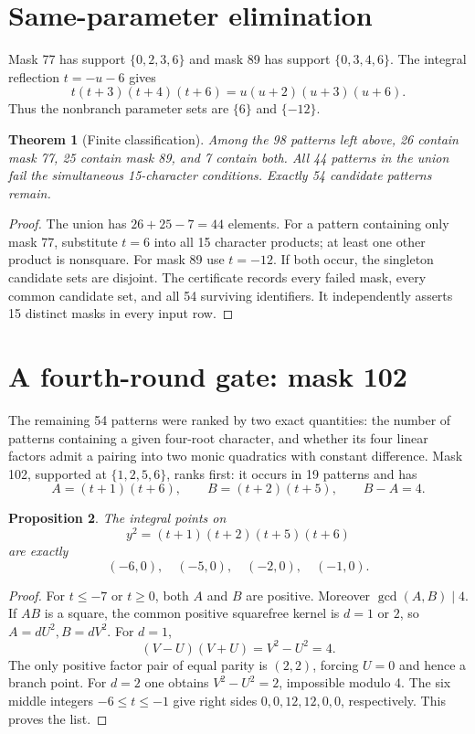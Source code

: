 \documentclass[11pt]{article}
\newtheorem{theorem}{Theorem}
\newtheorem{proposition}[theorem]{Proposition}
\begin{document}
\section{Same-parameter elimination}
Mask 77 has support $\{0,2,3,6\}$ and mask 89 has support
$\{0,3,4,6\}$. The integral reflection $t=-u-6$ gives
\[
 t(t+3)(t+4)(t+6)=u(u+2)(u+3)(u+6).
\]
Thus the nonbranch parameter sets are $\{6\}$ and $\{-12\}$.

\begin{theorem}[Finite classification]\label{thm:54}
Among the 98 patterns left above, 26 contain mask 77, 25 contain mask 89,
and 7 contain both. All 44 patterns in the union fail the simultaneous
15-character conditions. Exactly 54 candidate patterns remain.
\end{theorem}
\begin{proof}
The union has $26+25-7=44$ elements. For a pattern containing only mask
77, substitute $t=6$ into all 15 character products; at least one other
product is nonsquare. For mask 89 use $t=-12$. If both occur, the
singleton candidate sets are disjoint. The certificate records every
failed mask, every common candidate set, and all 54 surviving identifiers.
It independently asserts 15 distinct masks in every input row.
\end{proof}

\section{A fourth-round gate: mask 102}

The remaining 54 patterns were ranked by two exact quantities: the number
of patterns containing a given four-root character, and whether its four
linear factors admit a pairing into two monic quadratics with constant
difference. Mask 102, supported at $\{1,2,5,6\}$, ranks first: it occurs
in 19 patterns and has
\[
 A=(t+1)(t+6),\qquad B=(t+2)(t+5),\qquad B-A=4.
\]

\begin{proposition}\label{prop:102}
The integral points on
\[
 y^2=(t+1)(t+2)(t+5)(t+6)
\]
are exactly
\[
 (-6,0),\quad(-5,0),\quad(-2,0),\quad(-1,0).
\]
\end{proposition}
\begin{proof}
For $t\leq-7$ or $t\geq0$, both $A$ and $B$ are positive.
Moreover $\gcd(A,B)\mid4$. If $AB$ is a square, the common positive
squarefree kernel is $d=1$ or $2$, so $A=dU^2,B=dV^2$.
For $d=1$,
\[
 (V-U)(V+U)=V^2-U^2=4.
\]
The only positive factor pair of equal parity is $(2,2)$, forcing $U=0$
and hence a branch point. For $d=2$ one obtains
$V^2-U^2=2$, impossible modulo 4. The six middle integers
$-6\leq t\leq-1$ give right sides $0,0,12,12,0,0$, respectively.
This proves the list.
\end{proof}
\end{document}
